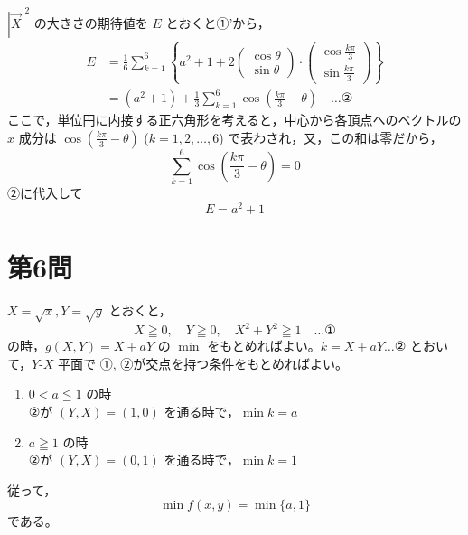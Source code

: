 \documentclass[../main.tex]{subfiles}
\begin{document}
\vspace{0.5em}
\noindent
$|\vec{X}|^2$ の大きさの期待値を $E$ とおくと①'から，
\[
  \begin{aligned}
    E &= \frac{1}{6} \sum_{k=1}^6 \left\{ a^2+1 + 2
      \begin{pmatrix} \cos\theta \\ \sin\theta
      \end{pmatrix} \cdot
      \begin{pmatrix} \cos\frac{k\pi}{3} \\ \sin\frac{k\pi}{3}
    \end{pmatrix} \right\} \\
    &= (a^2+1) + \frac{1}{3} \sum_{k=1}^6 \cos\left(\frac{k\pi}{3} - \theta\right) \quad \dots \text{②}
  \end{aligned}
\]
ここで，単位円に内接する正六角形を考えると，中心から各頂点へのベクトルの $x$ 成分は $\cos\left(\frac{k\pi}{3} - \theta\right)$ ($k=1, 2, \dots, 6$) で表わされ，又，この和は零だから，
\[
  \sum_{k=1}^6 \cos\left(\frac{k\pi}{3} - \theta\right) = 0
\]
②に代入して
\[
  E = a^2 + 1
\]

\newpage

\section*{第6問}

\noindent
[\textbf{解}] $X = \sqrt{x}, Y = \sqrt{y}$ とおくと，
\[
  X \geqq 0, \quad Y \geqq 0, \quad X^2 + Y^2 \geqq 1 \quad \dots \text{①}
\]
の時，$g(X, Y) = X + aY$ の $\min$ をもとめればよい。$k = X + aY \dots \text{②}$ とおいて，$Y$-$X$ 平面で ①, ②が交点を持つ条件をもとめればよい。

\begin{enumerate}
  \item[$1^\circ$] $0 < a \leqq 1$ の時\\
    ②が $(Y, X) = (1, 0)$ を通る時で，$\min k = a$
  \item[$2^\circ$] $a \geqq 1$ の時\\
    ②が $(Y, X) = (0, 1)$ を通る時で，$\min k = 1$
\end{enumerate}

\noindent
従って，
\[
  \min f(x, y) = \min \{a, 1\}
\]
である。

\begin{center}
\end{center}
\end{document}

